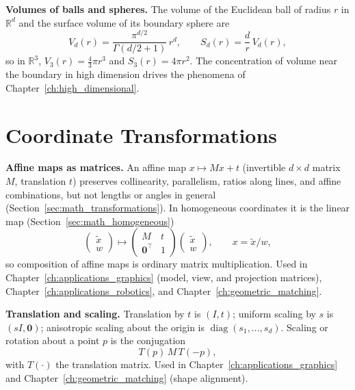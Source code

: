 \medskip\noindent\textbf{Volumes of balls and spheres.}
The volume of the Euclidean ball of radius $r$ in $\mathbb{R}^d$ and the
surface volume of its boundary sphere are
\[
  V_d(r) = \frac{\pi^{d/2}}{\Gamma(d/2 + 1)}\,r^d,
  \qquad
  S_d(r) = \frac{d}{r}\,V_d(r),
\]
so in $\mathbb{R}^3$, $V_3(r) = \frac{4}{3}\pi r^3$ and
$S_3(r) = 4\pi r^2$. The concentration of volume near the boundary in high
dimension drives the phenomena of Chapter~\ref{ch:high_dimensional}.


\section{Coordinate Transformations}
\label{sec:app_formulas_transformations}

\medskip\noindent\textbf{Affine maps as matrices.}
An affine map $x \mapsto Mx + t$ (invertible $d\times d$ matrix $M$,
translation $t$) preserves collinearity, parallelism, ratios along lines,
and affine combinations, but not lengths or angles in general
(Section~\ref{sec:math_transformations}). In homogeneous coordinates it is
the linear map (Section~\ref{sec:math_homogeneous})
\[
  \begin{pmatrix} \tilde x \\ w \end{pmatrix}
  \mapsto
  \begin{pmatrix} M & t \\ \mathbf{0}^\top & 1 \end{pmatrix}
  \begin{pmatrix} \tilde x \\ w \end{pmatrix},
  \qquad
  x = \tilde x / w,
\]
so composition of affine maps is ordinary matrix multiplication. Used in
Chapter~\ref{ch:applications_graphics} (model, view, and projection
matrices), Chapter~\ref{ch:applications_robotics}, and
Chapter~\ref{ch:geometric_matching}.

\medskip\noindent\textbf{Translation and scaling.}
Translation by $t$ is $(I, t)$; uniform scaling by $s$ is $(sI, \mathbf{0})$;
anisotropic scaling about the origin is
$\operatorname{diag}(s_1, \dots, s_d)$. Scaling or rotation about a point
$p$ is the conjugation
\[
  T(p)\,M\,T(-p),
\]
with $T(\cdot)$ the translation matrix. Used in Chapter~\ref{ch:applications_graphics}
and Chapter~\ref{ch:geometric_matching} (shape alignment).

